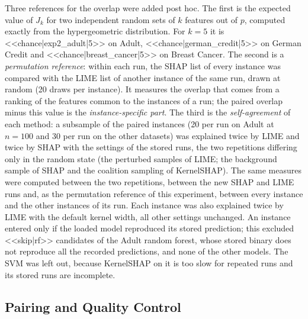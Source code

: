 \documentclass{cys}
\begin{document}
Three references for the overlap were added post hoc. The first is the expected
value of $J_k$ for two independent random sets of $k$ features out of $p$, computed exactly
from the hypergeometric distribution. For $k = 5$ it is <<chance|exp2_adult|5>> on Adult,
<<chance|german_credit|5>> on German Credit and <<chance|breast_cancer|5>> on Breast
Cancer. The second is a \emph{permutation reference}: within each run, the SHAP list of
every instance was compared with the LIME list of another instance of the same run, drawn
at random (20 draws per instance). It measures the overlap that comes from a ranking of
the features common to the instances of a run; the paired overlap minus this value is the
\emph{instance-specific part}. The third is the \emph{self-agreement} of each method: a subsample of
the paired instances (20 per run on Adult at $n = 100$ and 30 per run on the other datasets) was explained twice by LIME and twice by SHAP with the settings of
the stored runs, the two repetitions differing only in the random state (the perturbed
samples of LIME; the background sample of SHAP and the coalition sampling of KernelSHAP).
The same measures were computed between the two repetitions, between the new SHAP and
LIME runs and, as the permutation reference of this experiment, between every instance and
the other instances of its run. Each instance was also explained twice by LIME with the
default kernel width, all other settings unchanged. An instance entered only if the loaded
model reproduced its stored prediction; this excluded <<skip|rf>> candidates of the Adult
random forest, whose stored binary does not reproduce all the recorded predictions, and
none of the other models. The SVM was left out, because KernelSHAP on it is too slow for repeated runs and its stored runs are incomplete.

\subsection{Pairing and Quality Control}
\end{document}
